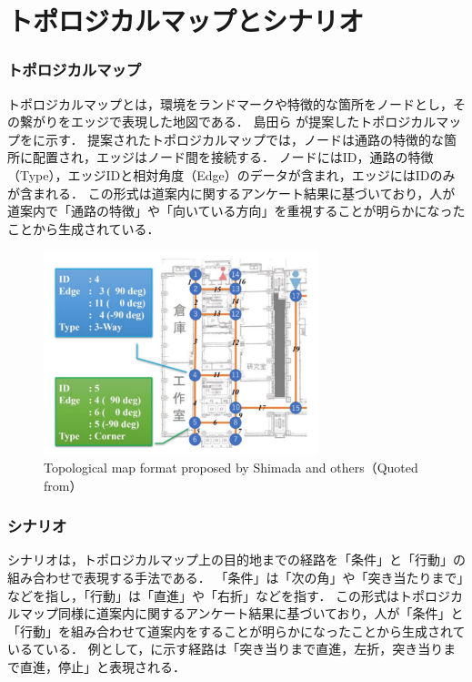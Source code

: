 \section{トポロジカルマップとシナリオ}
\subsubsection{トポロジカルマップ}
トポロジカルマップとは，環境をランドマークや特徴的な箇所をノードとし，その繋がりをエッジで表現した地図である．
島田ら \cite{shimada2020}が提案したトポロジカルマップをに示す．
提案されたトポロジカルマップでは，ノードは通路の特徴的な箇所に配置され，エッジはノード間を接続する．
ノードにはID，通路の特徴（Type），エッジIDと相対角度（Edge）のデータが含まれ，エッジにはIDのみが含まれる．
この形式は道案内に関するアンケート結果に基づいており，人が道案内で「通路の特徴」や「向いている方向」を重視することが明らかになったことから生成されている．

\begin{figure}[htbp]
  \centering
   \includegraphics[width=80mm]{images/pdf/shimada/topo.pdf}
   \caption[Topological map format proposed by Shimada and others]{Topological map format proposed by Shimada and others（Quoted from\cite{shimada2020}）}
   \label{fig:shimada_topo}
\end{figure}

\clearpage
\subsubsection{シナリオ}
シナリオは，トポロジカルマップ上の目的地までの経路を「条件」と「行動」の組み合わせで表現する手法である．
「条件」は「次の角」や「突き当たりまで」などを指し，「行動」は「直進」や「右折」などを指す．
この形式はトポロジカルマップ同様に道案内に関するアンケート結果に基づいており，人が「条件」と「行動」を組み合わせて道案内をすることが明らかになったことから生成されているている．
例として，に示す経路は「突き当りまで直進，左折，突き当りまで直進，停止」と表現される．


